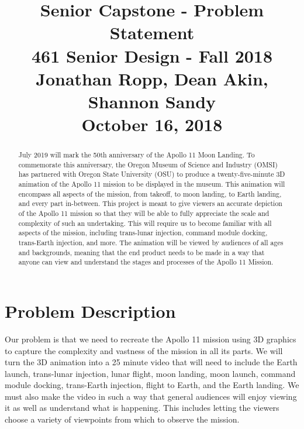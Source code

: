 \documentclass[onecolumn, draftclsnofoot,10pt, compsoc]{IEEEtran}
\begin{document}
\title{Senior Capstone - Problem Statement\\
	\large 461 Senior Design - Fall 2018\\
	\large Jonathan Ropp, Dean Akin, Shannon Sandy\\
	\large October 16, 2018}

\maketitle

\begin{abstract}

July 2019 will mark the 50th anniversary of the Apollo 11 Moon Landing. To commemorate this anniversary, the Oregon Museum of Science and Industry (OMSI) has partnered with Oregon State University (OSU) to produce a twenty-five-minute 3D animation of the Apollo 11 mission to be displayed in the museum. This animation will encompass all aspects of the mission, from takeoff, to moon landing, to Earth landing, and every part in-between. This project is meant to give viewers an accurate depiction of the Apollo 11 mission so that they will be able to fully appreciate the scale and complexity of such an undertaking. This will require us to become familiar with all aspects of the mission, including trans-lunar injection, command module docking, trans-Earth injection, and more. The animation will be viewed by audiences of all ages and backgrounds, meaning that the end product needs to be made in a way that anyone can view and understand the stages and processes of the Apollo 11 Mission.

\end{abstract}

\newpage

\section{Problem Description}
Our problem is that we need to recreate the Apollo 11 mission using 3D graphics to capture the complexity and vastness of the mission in all its parts. We will turn the 3D animation into a 25 minute video that will need to include the Earth launch, trans-lunar injection, lunar flight, moon landing, moon launch, command module docking, trans-Earth injection, flight to Earth, and the Earth landing. We must also make the video in such a way that general audiences will enjoy viewing it as well as understand what is happening. This includes letting the viewers choose a variety of viewpoints from which to observe the mission. 
\end{document}
